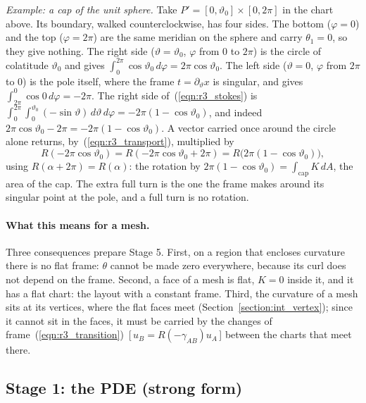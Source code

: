 \emph{Example: a cap of the unit sphere.} Take $P' = [0, \vartheta_0]\times[0, 2\pi]$ in the chart above. Its boundary, walked counterclockwise, has four sides. The bottom ($\varphi = 0$) and the top ($\varphi = 2\pi$) are the same meridian on the sphere and carry $\theta_1 = 0$, so they give nothing. The right side ($\vartheta = \vartheta_0$, $\varphi$ from $0$ to $2\pi$) is the circle of colatitude $\vartheta_0$ and gives $\int_0^{2\pi}\cos\vartheta_0\, d\varphi = 2\pi\cos\vartheta_0$. The left side ($\vartheta = 0$, $\varphi$ from $2\pi$ to $0$) is the pole itself, where the frame $t = \partial_\vartheta x$ is singular, and gives $\int_{2\pi}^0 \cos 0\, d\varphi = -2\pi$. The right side of~(\ref{eqn:r3_stokes}) is $\int_0^{2\pi}\!\int_0^{\vartheta_0} (-\sin\vartheta)\, d\vartheta\, d\varphi = -2\pi(1 - \cos\vartheta_0)$, and indeed $2\pi\cos\vartheta_0 - 2\pi = -2\pi(1 - \cos\vartheta_0)$. A vector carried once around the circle alone returns, by~(\ref{eqn:r3_transport}), multiplied by
\begin{equation*}
R(-2\pi\cos\vartheta_0) = R(-2\pi\cos\vartheta_0 + 2\pi) = R\big(2\pi(1 - \cos\vartheta_0)\big) ,
\end{equation*}
using $R(\alpha + 2\pi) = R(\alpha)$: the rotation by $2\pi(1 - \cos\vartheta_0) = \int_{\text{cap}} K\, dA$, the area of the cap. The extra full turn is the one the frame makes around its singular point at the pole, and a full turn is no rotation.

\paragraph{What this means for a mesh.} Three consequences prepare Stage 5. First, on a region that encloses curvature there is no flat frame: $\theta$ cannot be made zero everywhere, because its curl does not depend on the frame. Second, a face of a mesh is flat, $K = 0$ inside it, and it has a flat chart: the layout with a constant frame. Third, the curvature of a mesh sits at its vertices, where the flat faces meet (Section~\ref{section:int_vertex}); since it cannot sit in the faces, it must be carried by the changes of frame~(\ref{eqn:r3_transition})~[\,$u_B = R(-\gamma_{AB})u_A$\,] between the charts that meet there.

\subsection{Stage 1: the PDE (strong form)}
\label{section:r3_stage1}

